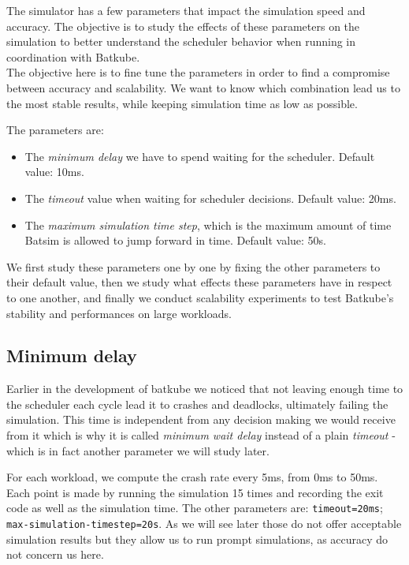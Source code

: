 \documentclass[12pt, a4paper]{memoir}
\begin{document}
The simulator has a few parameters that impact the simulation speed and
accuracy. The objective is to study the effects of these parameters on the
simulation to better understand the scheduler behavior when running in
coordination with Batkube.\\

The objective here is to fine tune the parameters in order to find a compromise
between accuracy and scalability. We want to know which combination lead us to
the most stable results, while keeping simulation time as low as possible.

The parameters are:
\begin{itemize}
	\item The \textit{minimum delay} we have to spend waiting for the
		scheduler. Default value: 10ms.
	\item The \textit{timeout} value when waiting for scheduler decisions.
		Default value: 20ms.
	\item The \textit{maximum simulation time step}, which is the maximum
		amount of time Batsim is allowed to jump forward in time.
		Default value: 50s.
\end{itemize}

We first study these parameters one by one by fixing the other parameters to
their default value, then we study what effects these parameters have in
respect to one another, and finally we conduct scalability experiments to test
Batkube's stability and performances on large workloads.

\subsection{Minimum delay}

Earlier in the development of batkube we noticed that not leaving enough time
to the scheduler each cycle lead it to crashes and deadlocks, ultimately
failing the simulation. This time is independent from any decision making we
would receive from it which is why it is called \textit{minimum wait delay}
instead of a plain \textit{timeout} - which is in fact another parameter we
will study later.

For each workload, we compute the crash rate every 5ms, from 0ms to 50ms. Each
point is made by running the simulation 15 times and recording the exit code as
well as the simulation time. The other parameters are: \texttt{timeout=20ms};
\texttt{max-simulation-timestep=20s}. As we will see later those do not offer
acceptable simulation results but they allow us to run prompt simulations, as
accuracy do not concern us here.\\
\end{document}
